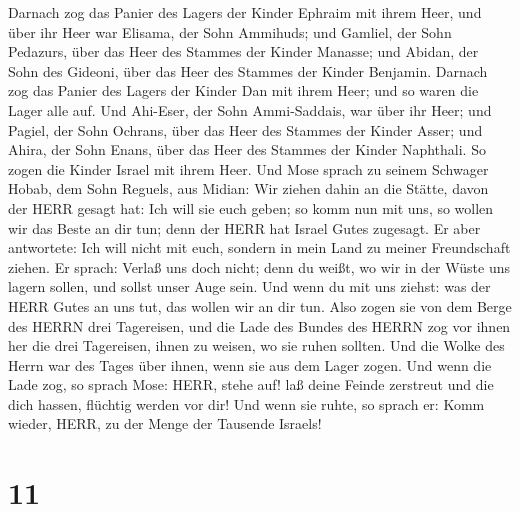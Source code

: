  Darnach zog das Panier des Lagers der Kinder Ephraim mit
ihrem Heer, und über ihr Heer war Elisama, der Sohn Ammihuds;
 und Gamliel, der Sohn Pedazurs, über das Heer des Stammes
der Kinder Manasse;  und Abidan, der Sohn des Gideoni, über
das Heer des Stammes der Kinder Benjamin.  Darnach zog das
Panier des Lagers der Kinder Dan mit ihrem Heer; und so waren die Lager
alle auf. Und Ahi-Eser, der Sohn Ammi-Saddais, war über ihr Heer;
 und Pagiel, der Sohn Ochrans, über das Heer des Stammes
der Kinder Asser;  und Ahira, der Sohn Enans, über das Heer
des Stammes der Kinder Naphthali.  So zogen die Kinder
Israel mit ihrem Heer.  Und Mose sprach zu seinem Schwager
Hobab, dem Sohn Reguels, aus Midian: Wir ziehen dahin an die Stätte,
davon der HERR gesagt hat: Ich will sie euch geben; so komm nun mit uns,
so wollen wir das Beste an dir tun; denn der HERR hat Israel Gutes
zugesagt.  Er aber antwortete: Ich will nicht mit euch,
sondern in mein Land zu meiner Freundschaft ziehen.  Er
sprach: Verlaß uns doch nicht; denn du weißt, wo wir in der Wüste uns
lagern sollen, und sollst unser Auge sein.  Und wenn du mit
uns ziehst: was der HERR Gutes an uns tut, das wollen wir an dir tun.
 Also zogen sie von dem Berge des HERRN drei Tagereisen,
und die Lade des Bundes des HERRN zog vor ihnen her die drei Tagereisen,
ihnen zu weisen, wo sie ruhen sollten.  Und die Wolke des
Herrn war des Tages über ihnen, wenn sie aus dem Lager zogen.
 Und wenn die Lade zog, so sprach Mose: HERR, stehe auf!
laß deine Feinde zerstreut und die dich hassen, flüchtig werden vor dir!
 Und wenn sie ruhte, so sprach er: Komm wieder, HERR, zu
der Menge der Tausende Israels!

\hypertarget{section-10}{%
\section{11}\label{section-10}}

